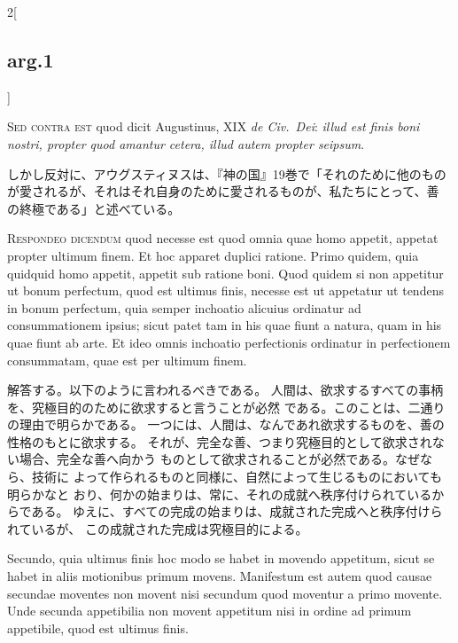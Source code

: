 \documentclass[paper=a4paper,fontsize=10pt,jafontsize=9pt,titlepage]{jlreq}
\begin{document}
\begin{paracol}{2}[\subsection{arg.1}]
\switchcolumn*[\subsection{s.c.}]

{\scshape Sed contra est} quod dicit Augustinus,
XIX {\itshape de Civ.~Dei}: {\itshape illud est finis boni nostri, propter quod amantur
cetera, illud autem propter seipsum}.

\switchcolumn

しかし反対に、アウグスティヌスは、『神の国』19巻で「それのために他のもの
 が愛されるが、それはそれ自身のために愛されるものが、私たちにとって、善
 の終極である」と述べている。


{\scshape Respondeo dicendum} quod necesse est quod
omnia quae homo appetit, appetat propter ultimum finem. Et hoc apparet
duplici ratione. Primo quidem, quia quidquid homo appetit, appetit sub
ratione boni. Quod quidem si non appetitur ut bonum perfectum, quod est
ultimus finis, necesse est ut appetatur ut tendens in bonum perfectum,
quia semper inchoatio alicuius ordinatur ad consummationem ipsius; sicut
patet tam in his quae fiunt a natura, quam in his quae fiunt ab arte. Et
ideo omnis inchoatio perfectionis ordinatur in perfectionem consummatam,
quae est per ultimum finem.

\switchcolumn

解答する。以下のように言われるべきである。
人間は、欲求するすべての事柄を、究極目的のために欲求すると言うことが必然
 である。このことは、二通りの理由で明らかである。
一つには、人間は、なんであれ欲求するものを、善の性格のもとに欲求する。
それが、完全な善、つまり究極目的として欲求されない場合、完全な善へ向かう
 ものとして欲求されることが必然である。なぜなら、技術に
 よって作られるものと同様に、自然によって生じるものにおいても明らかなと
 おり、何かの始まりは、常に、それの成就へ秩序付けられているからである。
ゆえに、すべての完成の始まりは、成就された完成へと秩序付けられているが、
 この成就された完成は究極目的による。

\switchcolumn*

Secundo, quia ultimus finis hoc modo se
habet in movendo appetitum, sicut se habet in aliis motionibus primum
movens. Manifestum est autem quod causae secundae moventes non movent
nisi secundum quod moventur a primo movente. Unde secunda appetibilia
non movent appetitum nisi in ordine ad primum appetibile, quod est
ultimus finis.


\end{paracol}
\end{document}
